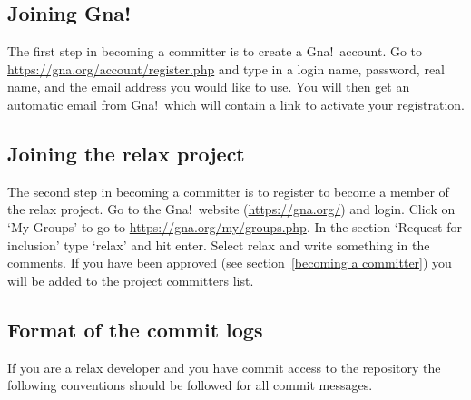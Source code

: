 \subsection{Joining Gna!}

The first step in becoming a committer is to create a Gna!\ account.  Go to \href{https://gna.org/account/register.php}{https://gna.org/account/register.php} and type in a login name, password, real name, and the email address you would like to use.  You will then get an automatic email from Gna!\ which will contain a link to activate your registration.



\subsection{Joining the relax project}

The second step in becoming a committer is to register to become a member of the relax project.  Go to the Gna!\ website (\href{https://gna.org/}{https://gna.org/}) and login.  Click on `My Groups' to go to \href{https://gna.org/my/groups.php}{https://gna.org/my/groups.php}.  In the section `Request for inclusion' type `relax' and hit enter.  Select relax and write something in the comments.  If you have been approved (see section~\ref{becoming a committer}) you will be added to the project committers list.



\subsection{Format of the commit logs}\label{commit log format}

If you are a relax developer and you have commit access to the repository the following conventions should be followed for all commit messages.

